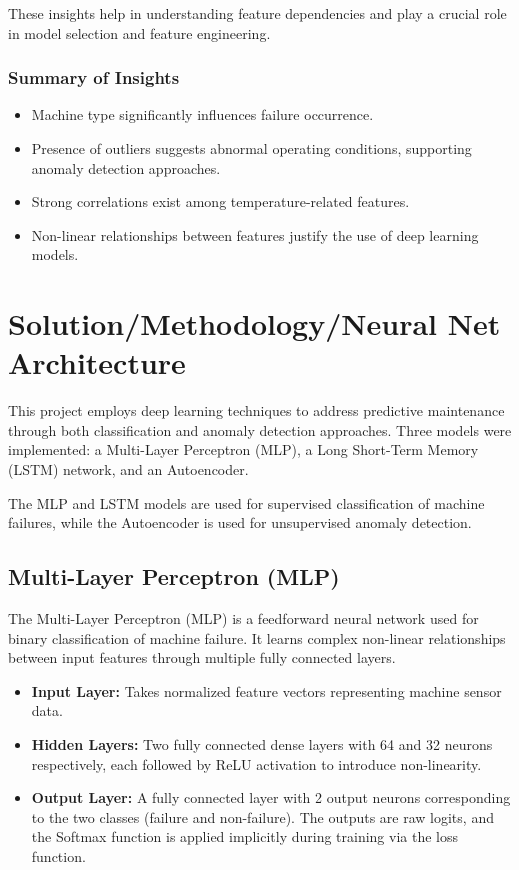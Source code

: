 \documentclass{ecsproject}     %
\begin{document}
These insights help in understanding feature dependencies and play a crucial role in model selection and feature engineering.

\subsection{Summary of Insights}

\begin{itemize}
    \item Machine type significantly influences failure occurrence.
    \item Presence of outliers suggests abnormal operating conditions, supporting anomaly detection approaches.
    \item Strong correlations exist among temperature-related features.
    \item Non-linear relationships between features justify the use of deep learning models.
\end{itemize}

\chapter{Solution/Methodology/Neural Net Architecture}
This project employs deep learning techniques to address predictive maintenance through both classification and anomaly detection approaches. Three models were implemented: a Multi-Layer Perceptron (MLP), a Long Short-Term Memory (LSTM) network, and an Autoencoder.

The MLP and LSTM models are used for supervised classification of machine failures, while the Autoencoder is used for unsupervised anomaly detection.

\section{Multi-Layer Perceptron (MLP)}

The Multi-Layer Perceptron (MLP) is a feedforward neural network used for binary classification of machine failure. It learns complex non-linear relationships between input features through multiple fully connected layers.

\begin{itemize}
    \item \textbf{Input Layer:} Takes normalized feature vectors representing machine sensor data.
    
    \item \textbf{Hidden Layers:} Two fully connected dense layers with 64 and 32 neurons respectively, each followed by ReLU activation to introduce non-linearity.
    
    \item \textbf{Output Layer:} A fully connected layer with 2 output neurons corresponding to the two classes (failure and non-failure). The outputs are raw logits, and the Softmax function is applied implicitly during training via the loss function.
\end{itemize}
\end{document}
